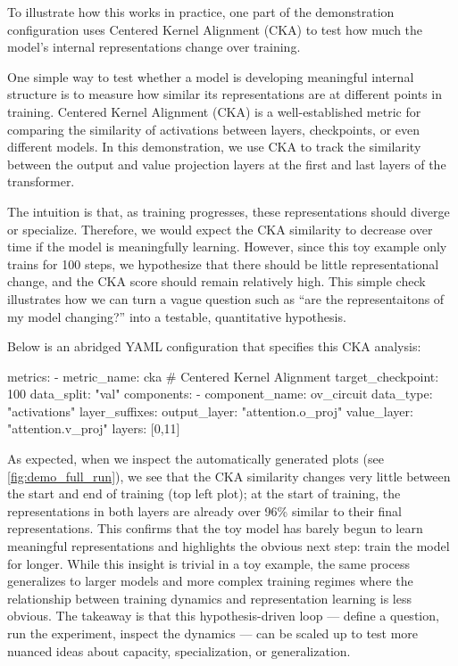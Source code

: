To illustrate how this works in practice, one part of the demonstration configuration uses Centered Kernel Alignment (CKA) to test how much the model's internal representations change over training.

One simple way to test whether a model is developing meaningful internal structure is to measure how similar its representations are at different points in training. Centered Kernel Alignment (CKA) is a well-established metric for comparing the similarity of activations between layers, checkpoints, or even different models. In this demonstration, we use CKA to track the similarity between the output and value projection layers at the first and last layers of the transformer.

The intuition is that, as training progresses, these representations should diverge or specialize. Therefore, we would expect the CKA similarity to decrease over time if the model is meaningfully learning. However, since this toy example only trains for 100 steps, we hypothesize that there should be little representational change, and the CKA score should remain relatively high. This simple check illustrates how we can turn a vague question such as “are the representaitons of my model changing?” into a testable, quantitative hypothesis.

Below is an abridged YAML configuration that specifies this CKA analysis:

\begin{center}
\begin{configlisting}
    metrics:
    - metric_name: cka # Centered Kernel Alignment
      target_checkpoint: 100
      data_split: "val"
      components: 
        - component_name: ov_circuit
          data_type: "activations"
          layer_suffixes: 
            output_layer: "attention.o_proj"
            value_layer: "attention.v_proj"
          layers: [0,11]

\end{configlisting}
\end{center}

As expected, when we inspect the automatically generated plots (see \cref{fig:demo_full_run}), we see that the CKA similarity changes very little between the start and end of training (top left plot); at the start of training, the representations in both layers are already over 96\% similar to their final representations. This confirms that the toy model has barely begun to learn meaningful representations and highlights the obvious next step: train the model for longer. While this insight is trivial in a toy example, the same process generalizes to larger models and more complex training regimes where the relationship between training dynamics and representation learning is less obvious. The takeaway is that this hypothesis-driven loop — define a question, run the experiment, inspect the dynamics — can be scaled up to test more nuanced ideas about capacity, specialization, or generalization.

